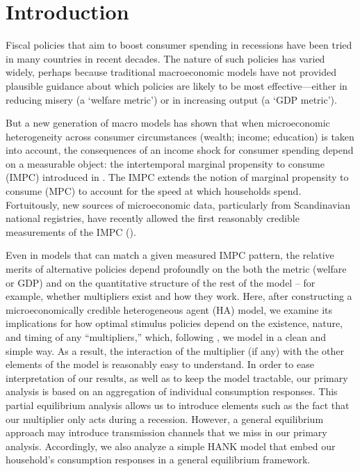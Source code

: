 \documentclass[\econtexRoot/HAFiscal]{subfiles}
\begin{document}
\hypertarget{introduction}{}\par\section{Introduction}\notinsubfile{\label{sec:intro}}
\setcounter{page}{0}

Fiscal policies that aim to boost consumer spending in recessions have been tried in many countries in recent decades.  The nature of such policies has varied widely, perhaps because traditional macroeconomic models have not provided plausible guidance about which policies are likely to be most effective---either in reducing misery (a `welfare metric') or in increasing output (a `GDP metric').

But a new generation of macro models has shown that when microeconomic heterogeneity across consumer circumstances (wealth; income; education) is taken into account, the consequences of an income shock for consumer spending depend on a measurable object: the intertemporal marginal propensity to consume (IMPC) introduced in \cite{auclert2018IKC}.  The IMPC extends the notion of marginal propensity to consume (MPC) to account for the speed at which households spend.  Fortuitously, new sources of microeconomic data, particularly from Scandinavian national registries, have recently allowed the first reasonably credible measurements of the IMPC (\cite{fagereng_mpc_2021}).

Even in models that can match a given measured IMPC pattern, the relative merits of alternative policies depend profoundly on the both the metric (welfare or GDP) and on the quantitative structure of the rest of the model -- for example, whether multipliers exist and how they work. Here, after constructing a microeconomically credible heterogeneous agent (HA) model, we examine its implications for how optimal stimulus policies depend on the existence, nature, and timing of any ``multipliers,'' which, following \cite{kmpHandbook2016}, we model in a clean and simple way.  As a result, the interaction of the multiplier (if any) with the other elements of the model is reasonably easy to understand. In order to ease interpretation of our results, as well as to keep the model tractable, our primary analysis is based on an aggregation of individual consumption responses. This partial equilibrium analysis allows us to introduce elements such as the fact that our multiplier only acts during a recession. However, a general equilibrium approach may introduce transmission channels that we miss in our primary analysis. Accordingly, we also analyze a simple HANK model that embed our household's consumption responses in a general equilibrium framework.
\end{document}
